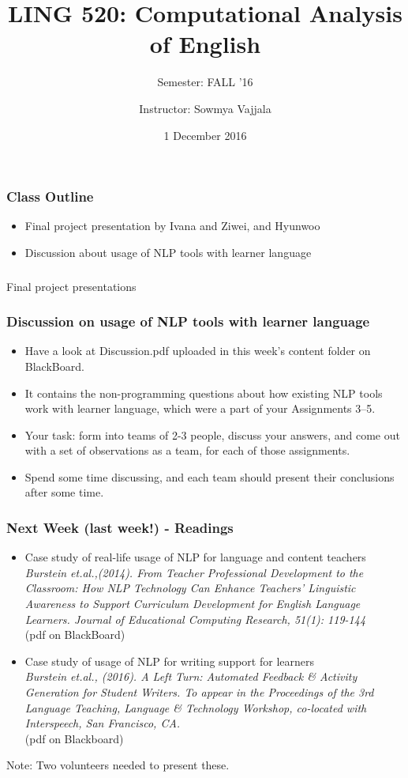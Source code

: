 \documentclass{beamer}
\author[Sowmya Vajjala]{Instructor: Sowmya Vajjala}
\title[LING 520]{LING 520: Computational Analysis of English}
\subtitle{Semester: FALL '16}
\date{1 December 2016}
\institute{Iowa State University, USA}
\begin{document}
\begin{frame}\titlepage
\end{frame}

\begin{frame}
\frametitle{Class Outline}
\begin{itemize}
\item Final project presentation by Ivana and Ziwei, and Hyunwoo
\item Discussion about usage of NLP tools with learner language  %
\end{itemize}
\end{frame}

\begin{frame} %
\frametitle{}
\Large Final project presentations
\end{frame}

\begin{frame}
\frametitle{Discussion on usage of NLP tools with learner language }
\begin{itemize}
\item Have a look at Discussion.pdf uploaded in this week's content folder on BlackBoard. 
\item It contains the non-programming questions about how existing NLP tools work with learner language, which were a part of your Assignments 3--5.
\item Your task: form into teams of 2-3 people, discuss your answers, and come out with a set of observations as a team, for each of those assignments. 
\item Spend some time discussing, and each team should present their conclusions after some time.
\end{itemize}
\end{frame}

\begin{frame}
\frametitle{Next Week (last week!) - Readings}
\begin{itemize}
\item Case study of real-life usage of NLP for language and  content teachers \\
\textit{Burstein  et.al.,(2014). From Teacher Professional Development to the Classroom: How NLP Technology Can Enhance Teachers’ Linguistic Awareness to Support Curriculum Development for English Language Learners. Journal of Educational Computing Research, 51(1): 119-144}
\\ (pdf on BlackBoard) 
\item Case study of usage of NLP for writing support for learners \\
\textit{Burstein et.al., (2016). A Left Turn: Automated Feedback \& Activity Generation for Student Writers. To appear in the Proceedings of the 3rd Language Teaching, Language \& Technology Workshop, co-located with Interspeech, San Francisco, CA.} \\ (pdf on Blackboard)
\end{itemize}
Note: Two volunteers needed to present these.
\end{frame}
\end{document}
